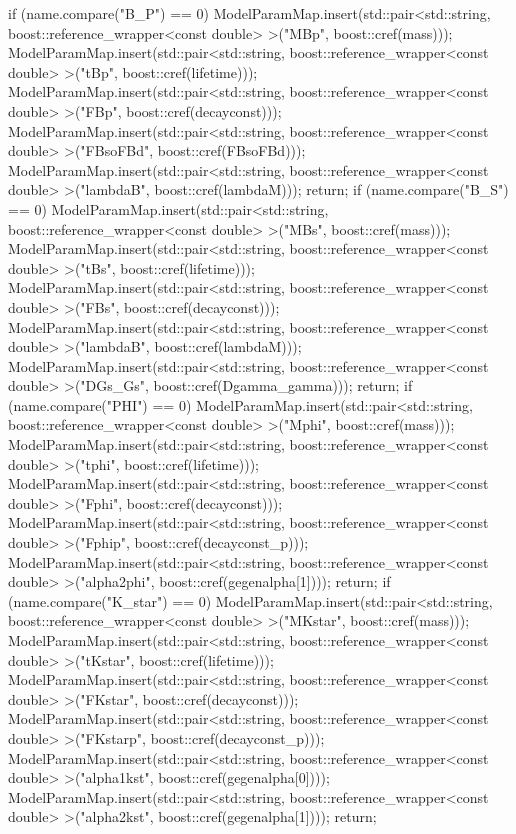 \documentclass[preprint,3p,12pt]{elsarticle}
\begin{document}
    if (name.compare("B_P") == 0) {
        ModelParamMap.insert(std::pair<std::string, boost::reference_wrapper<const double> >("MBp", boost::cref(mass)));
        ModelParamMap.insert(std::pair<std::string, boost::reference_wrapper<const double> >("tBp", boost::cref(lifetime)));
        ModelParamMap.insert(std::pair<std::string, boost::reference_wrapper<const double> >("FBp", boost::cref(decayconst)));
        ModelParamMap.insert(std::pair<std::string, boost::reference_wrapper<const double> >("FBsoFBd", boost::cref(FBsoFBd)));
        ModelParamMap.insert(std::pair<std::string, boost::reference_wrapper<const double> >("lambdaB", boost::cref(lambdaM)));
        return;
    }
    if (name.compare("B_S") == 0) {
        ModelParamMap.insert(std::pair<std::string, boost::reference_wrapper<const double> >("MBs", boost::cref(mass)));
        ModelParamMap.insert(std::pair<std::string, boost::reference_wrapper<const double> >("tBs", boost::cref(lifetime)));
        ModelParamMap.insert(std::pair<std::string, boost::reference_wrapper<const double> >("FBs", boost::cref(decayconst)));
        ModelParamMap.insert(std::pair<std::string, boost::reference_wrapper<const double> >("lambdaB", boost::cref(lambdaM)));
        ModelParamMap.insert(std::pair<std::string, boost::reference_wrapper<const double> >("DGs_Gs", boost::cref(Dgamma_gamma)));
        return;
    }
    if (name.compare("PHI") == 0) {
        ModelParamMap.insert(std::pair<std::string, boost::reference_wrapper<const double> >("Mphi", boost::cref(mass)));
        ModelParamMap.insert(std::pair<std::string, boost::reference_wrapper<const double> >("tphi", boost::cref(lifetime)));
        ModelParamMap.insert(std::pair<std::string, boost::reference_wrapper<const double> >("Fphi", boost::cref(decayconst)));
        ModelParamMap.insert(std::pair<std::string, boost::reference_wrapper<const double> >("Fphip", boost::cref(decayconst_p)));
        ModelParamMap.insert(std::pair<std::string, boost::reference_wrapper<const double> >("alpha2phi", boost::cref(gegenalpha[1])));
        return;
    }
    if (name.compare("K_star") == 0) {
        ModelParamMap.insert(std::pair<std::string, boost::reference_wrapper<const double> >("MKstar", boost::cref(mass)));
        ModelParamMap.insert(std::pair<std::string, boost::reference_wrapper<const double> >("tKstar", boost::cref(lifetime)));
        ModelParamMap.insert(std::pair<std::string, boost::reference_wrapper<const double> >("FKstar", boost::cref(decayconst)));
        ModelParamMap.insert(std::pair<std::string, boost::reference_wrapper<const double> >("FKstarp", boost::cref(decayconst_p)));
        ModelParamMap.insert(std::pair<std::string, boost::reference_wrapper<const double> >("alpha1kst", boost::cref(gegenalpha[0])));
        ModelParamMap.insert(std::pair<std::string, boost::reference_wrapper<const double> >("alpha2kst", boost::cref(gegenalpha[1])));
        return;
    }
\end{document}
